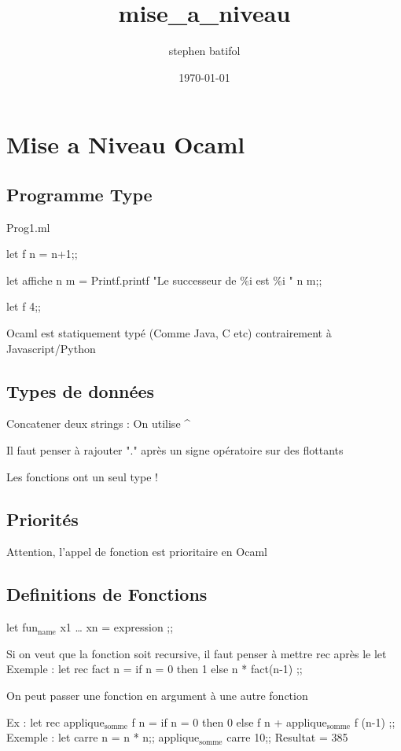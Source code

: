 \documentclass[11pt]{article}
\author{stephen batifol}
\date{\today}
\title{mise\_a\_niveau}
\begin{document}
\maketitle
\tableofcontents

\section{Mise a Niveau Ocaml}
\label{sec-1}

\subsection{Programme Type}
\label{sec-1-1}

Prog1.ml

let f n = n+1;;

let affiche n m = Printf.printf "Le successeur de \%i est \%i \n" n m;;

let f 4;;

Ocaml est statiquement typé (Comme Java, C etc) contrairement à Javascript/Python

\subsection{Types de données}
\label{sec-1-2}
Concatener deux strings : On utilise \^{}

Il faut penser à rajouter "." après un signe opératoire sur des flottants

Les fonctions ont un seul type ! 
\subsection{Priorités}
\label{sec-1-3}
Attention, l'appel de fonction est prioritaire en Ocaml

\subsection{Definitions de Fonctions}
\label{sec-1-4}
let fun$_{\text{name}}$ x1 \ldots{} xn = expression ;;

Si on veut que la fonction soit recursive, il faut penser à mettre rec après le let
Exemple : 
let rec fact n = 
   if n = 0 then 1 
   else n * fact(n-1)
   ;;

On peut passer une fonction en argument à une autre fonction

Ex : 
  let rec applique$_{\text{somme}}$ f n =
     if n = 0 then 0 
     else f n + applique$_{\text{somme}}$ f (n-1)
     ;;
 Exemple : 
 let carre n = n * n;;
 applique$_{\text{somme}}$ carre 10;;
 Resultat = 385
\end{document}
